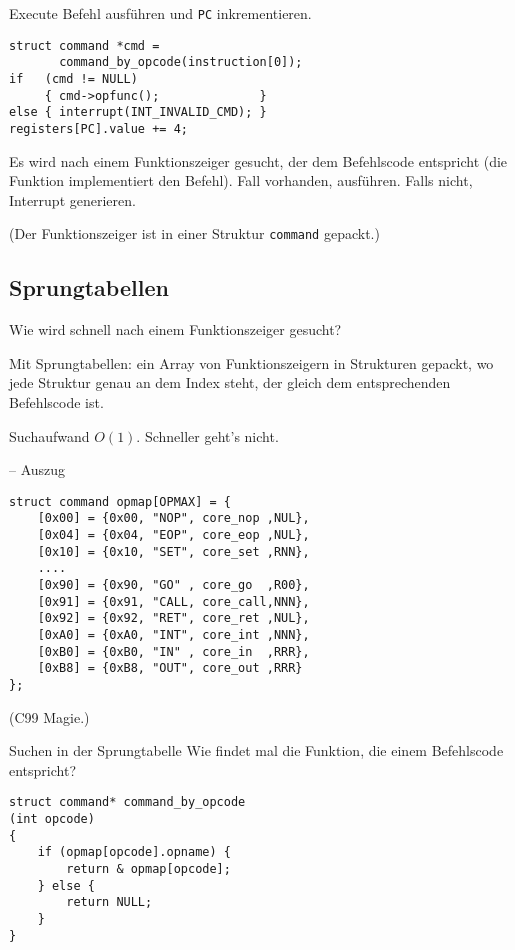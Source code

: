 \begin{frame}[fragile]{Execute}
 Befehl ausführen und \texttt{PC} inkrementieren.
\begin{lstlisting}
struct command *cmd = 
       command_by_opcode(instruction[0]);
if   (cmd != NULL) 
     { cmd->opfunc();              } 
else { interrupt(INT_INVALID_CMD); }
registers[PC].value += 4;
\end{lstlisting}

Es wird nach einem Funktionszeiger gesucht, der dem Befehlscode entspricht
(die Funktion implementiert den Befehl).
Fall vorhanden, ausführen. Falls nicht, Interrupt generieren.

(Der Funktionszeiger ist in einer Struktur \texttt{command} gepackt.)
\end{frame}


\subsection{Sprungtabellen}

\begin{frame}{\insertsubsection}
 Wie wird schnell nach einem Funktionszeiger gesucht?
 
 Mit Sprungtabellen: ein Array von Funktionszeigern in Strukturen gepackt, wo
 jede Struktur genau an dem Index steht, der gleich dem entsprechenden
 Befehlscode ist.
 
 Suchaufwand $O(1)$. Schneller geht's nicht.
\end{frame}


\begin{frame}[fragile]{\insertsubsection{} -- Auszug}
\begin{lstlisting}
struct command opmap[OPMAX] = {
    [0x00] = {0x00, "NOP", core_nop ,NUL},
    [0x04] = {0x04, "EOP", core_eop ,NUL},
    [0x10] = {0x10, "SET", core_set ,RNN},
    ....
    [0x90] = {0x90, "GO" , core_go  ,R00},
    [0x91] = {0x91, "CALL, core_call,NNN},
    [0x92] = {0x92, "RET", core_ret ,NUL},
    [0xA0] = {0xA0, "INT", core_int ,NNN},
    [0xB0] = {0xB0, "IN" , core_in  ,RRR},
    [0xB8] = {0xB8, "OUT", core_out ,RRR}
};
\end{lstlisting}
(C99 Magie.)
\end{frame}

\begin{frame}[fragile]{Suchen in der Sprungtabelle}
 Wie findet mal die Funktion, die einem Befehlscode entspricht?
\begin{lstlisting}
struct command* command_by_opcode
(int opcode)
{  
    if (opmap[opcode].opname) {
        return & opmap[opcode];
    } else {
        return NULL;
    }
}
\end{lstlisting}
\end{frame}


